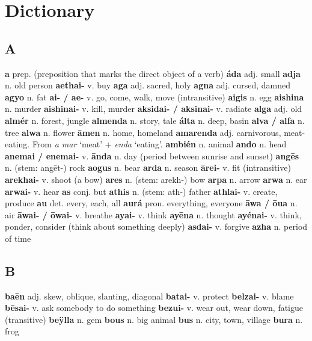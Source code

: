 \chapter{Dictionary}

\newcommand{\entry}[3]{\textbf{#1} #2. #3\newline}

\begin{multicols}{3}

\section*{A}
\entry{a}{prep}{(preposition that marks the direct object of a verb)}
\entry{áda}{adj}{small}
\entry{adja}{n}{old person}
\entry{aethai-}{v}{buy}
\entry{aga}{adj}{sacred, holy}
\entry{agna}{adj}{cursed, damned}
\entry{agyo}{n}{fat}
\entry{ai- / ae-}{v}{go, come, walk, move (intransitive)}
\entry{aigis}{n}{egg}
\entry{aishina}{n}{murder}
\entry{aishinai-}{v}{kill, murder}
\entry{aksidai- / aksinai-}{v}{radiate}
\entry{alga}{adj}{old}
\entry{almér}{n}{forest, jungle}
\entry{almenda}{n}{story, tale}
\entry{álta}{n}{deep, basin}
\entry{alva / alfa}{n}{tree}
\entry{alwa}{n}{flower}
\entry{āmen}{n}{home, homeland}
\entry{amarenda}{adj}{carnivorous, meat-eating. From \emph{a mar} `meat' + \emph{enda} `eating'.}
\entry{ambién}{n}{animal}
\entry{ando}{n}{head}
\entry{anemai / enemai-}{v}{}
\entry{ānda}{n}{day (period between sunrise and sunset)}
\entry{angēs}{n}{(stem: angēt-) rock}
\entry{aogus}{n}{bear}
\entry{arda}{n}{season}
\entry{ārei-}{v}{fit (intransitive)}
\entry{arekhai-}{v}{shoot (a bow)}
\entry{ares}{n}{(stem: arekh-) bow}
\entry{arpa}{n}{arrow}
\entry{arwa}{n}{ear}
\entry{arwai-}{v}{hear}
\entry{as}{conj}{but}
\entry{athis}{n}{(stem: ath-) father}
\entry{athlai-}{v}{create, produce}
\entry{au}{det}{every, each, all}
\entry{aurá}{pron}{everything, everyone}
\entry{āwa / ōua}{n}{air}
\entry{āwai- / ōwai-}{v}{breathe}
\entry{ayai-}{v}{think}
\entry{ayēna}{n}{thought}
\entry{ayénai-}{v}{think, ponder, consider (think about something deeply)}
\entry{asdai-}{v}{forgive}
\entry{azha}{n}{period of time}

\section*{B}
\entry{baēn}{adj}{skew, oblique, slanting, diagonal}
\entry{batai-}{v}{protect}
\entry{belzai-}{v}{blame}
\entry{bēsai-}{v}{ask somebody to do something}
\entry{bezui-}{v}{wear out, wear down, fatigue (transitive)}
\entry{beÿlla}{n}{gem}
\entry{bous}{n}{big animal}
\entry{bus}{n}{city, town, village}
\entry{bura}{n}{frog}


\end{multicols}
